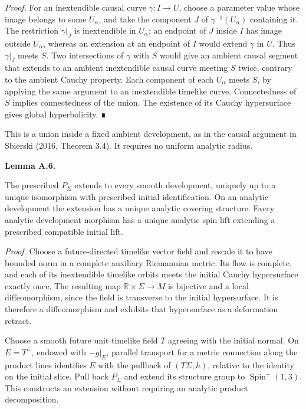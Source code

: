 \documentclass[
  english,
  11pt,
  reqno]{amsart}
\makeatletter
\newcommand{\pandocstatementheading}[1]{%
  \par\addpenalty{\@beginparpenalty}%
  \addvspace{.5\baselineskip plus .2\baselineskip minus .2\baselineskip}%
  {\normalfont\bfseries #1\par}%
  \nobreak\@afterindenttrue\@afterheading
}
\makeatother
\begin{document}
\emph{Proof.} For an inextendible causal curve \(\gamma:I\to U\), choose
a parameter value whose image belongs to some \(U_\alpha\), and take the
component \(J\) of \(\gamma^{-1}(U_\alpha)\) containing it. The
restriction \(\gamma|_J\) is inextendible in \(U_\alpha\): an endpoint
of \(J\) inside \(I\) has image outside \(U_\alpha\), whereas an
extension at an endpoint of \(I\) would extend \(\gamma\) in \(U\). Thus
\(\gamma|_J\) meets \(S\). Two intersections of \(\gamma\) with \(S\)
would give an ambient causal segment that extends to an ambient
inextendible causal curve meeting \(S\) twice, contrary to the ambient
Cauchy property. Each component of each \(U_\alpha\) meets \(S\), by
applying the same argument to an inextendible timelike curve.
Connectedness of \(S\) implies connectedness of the union. The existence
of its Cauchy hypersurface gives global hyperbolicity. ∎

This is a union inside a fixed ambient development, as in the causal
argument in Sbierski (2016, Theorem 3.4). It requires no uniform
analytic radius.

\pandocstatementheading{\protect{}\label{lem:relative-spin-extension-v2}Lemma A.6.}

The prescribed \(P_\Sigma\) extends to every smooth development,
uniquely up to a unique isomorphism with prescribed initial
identification. On an analytic development the extension has a unique
analytic covering structure. Every analytic development morphism has a
unique analytic spin lift extending a prescribed compatible initial
lift.

\emph{Proof.} Choose a future-directed timelike vector field and rescale
it to have bounded norm in a complete auxiliary Riemannian metric. Its
flow is complete, and each of its inextendible timelike orbits meets the
initial Cauchy hypersurface exactly once. The resulting map
\(\mathbb R\times\Sigma\to M\) is bijective and a local diffeomorphism,
since the field is transverse to the initial hypersurface. It is
therefore a diffeomorphism and exhibits that hypersurface as a
deformation retract.

Choose a smooth future unit timelike field \(T\) agreeing with the
initial normal. On \(E=T^\perp\), endowed with \(-g|_E\), parallel
transport for a metric connection along the product lines identifies
\(E\) with the pullback of \((T\Sigma,h)\), relative to the identity on
the initial slice. Pull back \(P_\Sigma\) and extend its structure group
to \(\operatorname{Spin}^{+}(1,3)\). This constructs an extension
without requiring an analytic product decomposition.
\end{document}
